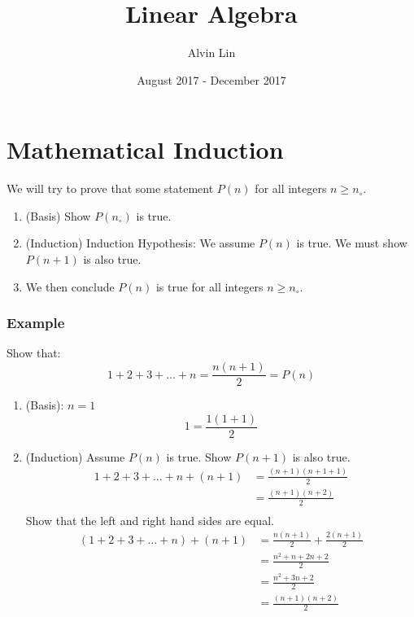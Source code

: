 \documentclass[letterpaper, 12pt]{math}
\title{Linear Algebra}
\author{Alvin Lin}
\date{August 2017 - December 2017}
\begin{document}
\maketitle

\section*{Mathematical Induction}
We will try to prove that some statement \( P(n) \) for all integers \( n \ge
n_{\circ} \).
\begin{enumerate}
  \item (Basis) Show \( P(n_{\circ}) \) is true.
  \item (Induction) Induction Hypothesis: We assume \( P(n) \) is true.
    We must show \( P(n+1) \) is also true.
  \item We then conclude \( P(n) \) is true for all integers
    \( n \ge n_{\circ} \).
\end{enumerate}

\subsubsection*{Example}
Show that:
\[ 1+2+3+\dots+n = \frac{n(n+1)}{2} = P(n) \]
\begin{enumerate}
  \item (Basis): \( n = 1 \)
    \[ 1 = \frac{1(1+1)}{2} \]
  \item (Induction) Assume \( P(n) \) is true. Show \( P(n+1) \) is also true.
    \begin{align*}
      1+2+3+\dots+n+(n+1) &= \frac{(n+1)(n+1+1)}{2} \\
      &= \frac{(n+1)(n+2)}{2} \\
    \end{align*}
    Show that the left and right hand sides are equal.
    \begin{align*}
      (1+2+3+\dots+n)+(n+1) &= \frac{n(n+1)}{2}+\frac{2(n+1)}{2} \\
      &= \frac{n^2+n+2n+2}{2} \\
      &= \frac{n^2+3n+2}{2} \\
      &= \frac{(n+1)(n+2)}{2}
    \end{align*}
\end{enumerate}
\end{document}
